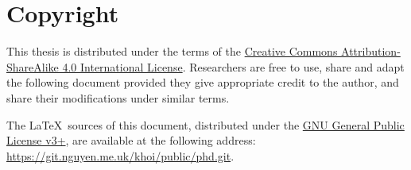\chapter*{Copyright}

This thesis is distributed under the terms of the
\href{http://creativecommons.org/licenses/by-sa/4.0/}{Creative Commons Attribution-ShareAlike 4.0 International License}.
Researchers are free to use, share and adapt the following document
provided they give appropriate credit to the author, and share their modifications under similar terms.

The \LaTeX\ sources of this document,
distributed under the \href{https://www.gnu.org/licenses/gpl.html}{GNU General Public License v3+},
are available at the following address: \url{https://git.nguyen.me.uk/khoi/public/phd.git}.
